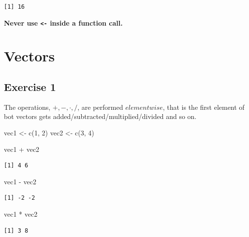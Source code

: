 \documentclass[
  letterpaper,
  DIV=11,
  numbers=noendperiod]{scrreprt}
\newenvironment{Shaded}{\begin{snugshade}}{\end{snugshade}}
\newcommand{\DecValTok}[1]{\textcolor[rgb]{0.68,0.00,0.00}{#1}}
\newcommand{\FunctionTok}[1]{\textcolor[rgb]{0.28,0.35,0.67}{#1}}
\newcommand{\NormalTok}[1]{\textcolor[rgb]{0.00,0.23,0.31}{#1}}
\newcommand{\OtherTok}[1]{\textcolor[rgb]{0.00,0.23,0.31}{#1}}
\newcommand{\SpecialCharTok}[1]{\textcolor[rgb]{0.37,0.37,0.37}{#1}}
\begin{document}
\begin{verbatim}
[1] 16
\end{verbatim}

\textbf{Never use \texttt{\textless{}-} inside a function call.}

\section{Vectors}\label{vectors-1}

\subsection{Exercise 1}\label{exercise-1-2}

The operations, \(+, -, \cdot, /\), are performed \(elementwise\), that
is the first element of bot vectors gets
added/subtracted/multiplied/divided and so on.

\begin{Shaded}
\begin{Highlighting}[]
\NormalTok{vec1 }\OtherTok{\textless{}{-}} \FunctionTok{c}\NormalTok{(}\DecValTok{1}\NormalTok{, }\DecValTok{2}\NormalTok{)}
\NormalTok{vec2 }\OtherTok{\textless{}{-}} \FunctionTok{c}\NormalTok{(}\DecValTok{3}\NormalTok{, }\DecValTok{4}\NormalTok{)}

\NormalTok{vec1 }\SpecialCharTok{+}\NormalTok{ vec2}
\end{Highlighting}
\end{Shaded}

\begin{verbatim}
[1] 4 6
\end{verbatim}

\begin{Shaded}
\begin{Highlighting}[]
\NormalTok{vec1 }\SpecialCharTok{{-}}\NormalTok{ vec2}
\end{Highlighting}
\end{Shaded}

\begin{verbatim}
[1] -2 -2
\end{verbatim}

\begin{Shaded}
\begin{Highlighting}[]
\NormalTok{vec1 }\SpecialCharTok{*}\NormalTok{ vec2}
\end{Highlighting}
\end{Shaded}

\begin{verbatim}
[1] 3 8
\end{verbatim}
\end{document}
